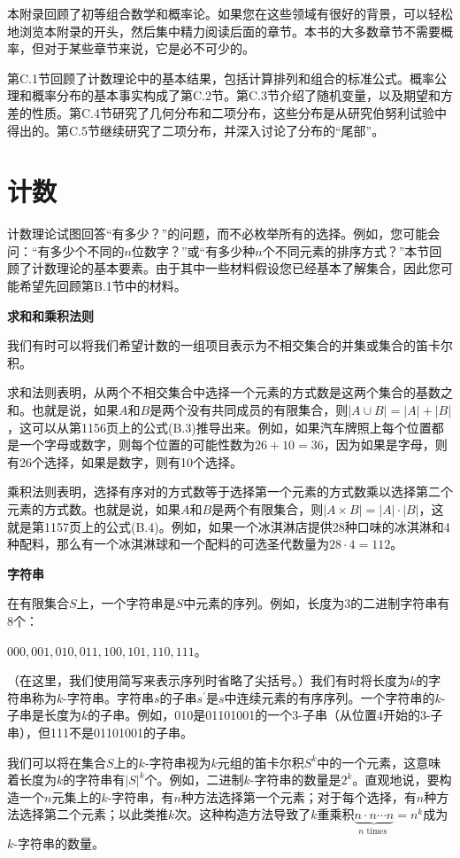 \documentclass[lang=cn,newtx,10pt,scheme=chinese]{elegantbook}
\begin{document}
本附录回顾了初等组合数学和概率论。如果您在这些领域有很好的背景，可以轻松地浏览本附录的开头，然后集中精力阅读后面的章节。本书的大多数章节不需要概率，但对于某些章节来说，它是必不可少的。

第C.1节回顾了计数理论中的基本结果，包括计算排列和组合的标准公式。概率公理和概率分布的基本事实构成了第C.2节。第C.3节介绍了随机变量，以及期望和方差的性质。第C.4节研究了几何分布和二项分布，这些分布是从研究伯努利试验中得出的。第C.5节继续研究了二项分布，并深入讨论了分布的“尾部”。

\section{计数}

计数理论试图回答“有多少？”的问题，而不必枚举所有的选择。例如，您可能会问：“有多少个不同的$n$位数字？”或“有多少种$n$个不同元素的排序方式？”本节回顾了计数理论的基本要素。由于其中一些材料假设您已经基本了解集合，因此您可能希望先回顾第B.1节中的材料。

\textbf{求和和乘积法则}

我们有时可以将我们希望计数的一组项目表示为不相交集合的并集或集合的笛卡尔积。

求和法则表明，从两个不相交集合中选择一个元素的方式数是这两个集合的基数之和。也就是说，如果$A$和$B$是两个没有共同成员的有限集合，则$|A\cup B|=|A|+|B|$，这可以从第1156页上的公式(B.3)推导出来。例如，如果汽车牌照上每个位置都是一个字母或数字，则每个位置的可能性数为$26+10=36$，因为如果是字母，则有26个选择，如果是数字，则有10个选择。

乘积法则表明，选择有序对的方式数等于选择第一个元素的方式数乘以选择第二个元素的方式数。也就是说，如果$A$和$B$是两个有限集合，则$|A\times B|=|A|\cdot |B|$，这就是第1157页上的公式(B.4)。例如，如果一个冰淇淋店提供28种口味的冰淇淋和4种配料，那么有一个冰淇淋球和一个配料的可选圣代数量为$28\cdot 4=112$。

\textbf{字符串}

在有限集合$S$上，一个字符串是$S$中元素的序列。例如，长度为3的二进制字符串有8个：

$000,001,010,011,100,101,110,111$。

（在这里，我们使用简写来表示序列时省略了尖括号。）我们有时将长度为$k$的字符串称为$k$-字符串。字符串$s$的子串$s^{\prime}$是$s$中连续元素的有序序列。一个字符串的$k$-子串是长度为$k$的子串。例如，010是01101001的一个3-子串（从位置4开始的3-子串），但111不是01101001的子串。

我们可以将在集合$S$上的$k$-字符串视为$k$元组的笛卡尔积$S^k$中的一个元素，这意味着长度为$k$的字符串有$|S|^k$个。例如，二进制$k$-字符串的数量是$2^k$。直观地说，要构造一个$n$元集上的$k$-字符串，有$n$种方法选择第一个元素；对于每个选择，有$n$种方法选择第二个元素；以此类推$k$次。这种构造方法导致了$k$重乘积$\underbrace{n \cdot n \cdots n}_{n \text { times }}=n^k$成为$k$-字符串的数量。
\end{document}

